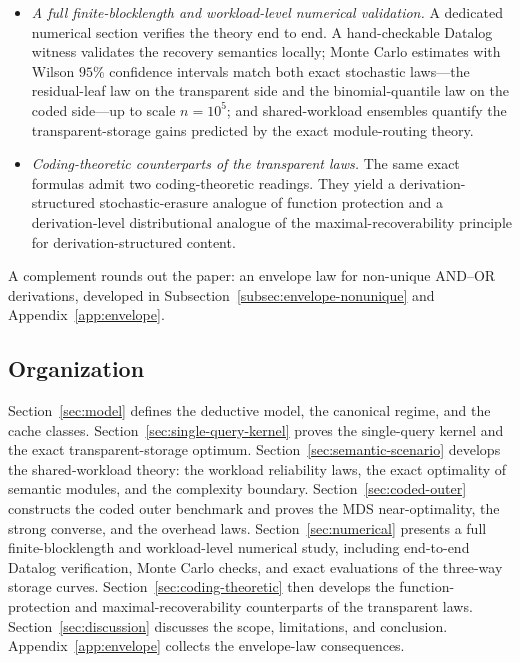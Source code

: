 \documentclass[journal]{IEEEtran}
\numberwithin{equation}{section}
\begin{document}
\begin{itemize}[leftmargin=5mm]
\item \emph{A full finite-blocklength and workload-level numerical validation.}
A dedicated numerical section verifies the theory end to end.  A hand-checkable
Datalog witness validates the recovery semantics locally; Monte Carlo
estimates with Wilson \(95\%\) confidence intervals match both exact
stochastic laws---the residual-leaf law on the transparent side and the
binomial-quantile law on the coded side---up to scale \(n=10^{5}\); and
shared-workload ensembles quantify the transparent-storage gains predicted by
the exact module-routing theory.

\item \emph{Coding-theoretic counterparts of the transparent laws.}
The same exact formulas admit two coding-theoretic readings.  They yield a
derivation-structured stochastic-erasure analogue of function protection and
a derivation-level distributional analogue of the maximal-recoverability
principle for derivation-structured content.
\end{itemize}

A complement rounds out the paper: an envelope law for non-unique
AND--OR derivations, developed in
Subsection~\ref{subsec:envelope-nonunique} and
Appendix~\ref{app:envelope}.

\subsection{Organization}
\label{subsec:organization}

Section~\ref{sec:model} defines the deductive model, the canonical regime,
and the cache classes.  Section~\ref{sec:single-query-kernel} proves the
single-query kernel and the exact transparent-storage optimum.
Section~\ref{sec:semantic-scenario} develops the shared-workload theory:
the workload reliability laws, the exact optimality of semantic modules,
and the complexity boundary.
Section~\ref{sec:coded-outer} constructs the coded outer benchmark and
proves the MDS near-optimality, the strong converse, and the overhead
laws.  Section~\ref{sec:numerical} presents a full finite-blocklength and
workload-level numerical study, including end-to-end Datalog verification,
Monte Carlo checks, and exact evaluations of the three-way storage curves.
Section~\ref{sec:coding-theoretic} then develops the function-protection
and maximal-recoverability counterparts of the transparent laws.
Section~\ref{sec:discussion} discusses the scope, limitations, and
conclusion.  Appendix~\ref{app:envelope} collects the envelope-law
consequences.
\end{document}
